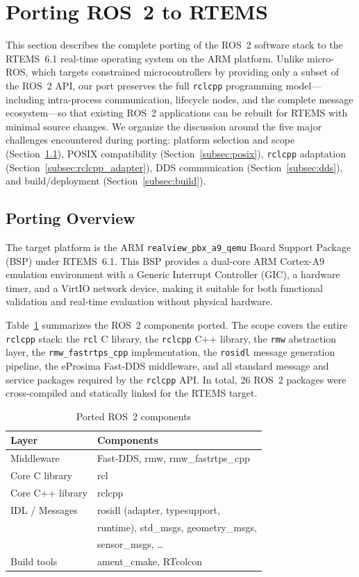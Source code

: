 \section{Porting ROS~2 to RTEMS}
\label{sec:porting}

This section describes the complete porting of the ROS~2 software stack to the RTEMS~6.1 real-time operating system on the ARM platform.
Unlike micro-ROS, which targets constrained microcontrollers by providing only a subset of the ROS~2 API, our port preserves the full \texttt{rclcpp} programming model---including intra-process communication, lifecycle nodes, and the complete message ecosystem---so that existing ROS~2 applications can be rebuilt for RTEMS with minimal source changes.
We organize the discussion around the five major challenges encountered during porting: platform selection and scope (Section~\ref{subsec:overview}), POSIX compatibility (Section~\ref{subsec:posix}), \texttt{rclcpp} adaptation (Section~\ref{subsec:rclcpp_adapter}), DDS communication (Section~\ref{subsec:dds}), and build/deployment (Section~\ref{subsec:build}).

\subsection{Porting Overview}
\label{subsec:overview}

The target platform is the ARM \texttt{realview\_pbx\_a9\_qemu} Board Support Package (BSP) under RTEMS~6.1.
This BSP provides a dual-core ARM Cortex-A9 emulation environment with a Generic Interrupt Controller (GIC), a hardware timer, and a VirtIO network device, making it suitable for both functional validation and real-time evaluation without physical hardware.

Table~\ref{tab:ported_components} summarizes the ROS~2 components ported.
The scope covers the entire \texttt{rclcpp} stack: the \texttt{rcl} C library, the \texttt{rclcpp} C++ library, the \texttt{rmw} abstraction layer, the \texttt{rmw\_fastrtps\_cpp} implementation, the \texttt{rosidl} message generation pipeline, the eProsima Fast-DDS middleware, and all standard message and service packages required by the \texttt{rclcpp} API.
In total, 26 ROS~2 packages were cross-compiled and statically linked for the RTEMS target.

\begin{table}[t]
\centering
\caption{Ported ROS~2 components}
\label{tab:ported_components}
\begin{tabular}{ll}
\hline
\textbf{Layer} & \textbf{Components} \\
\hline
Middleware    & Fast-DDS, rmw, rmw\_fastrtps\_cpp \\
Core C library & rcl \\
Core C++ library & rclcpp \\
IDL / Messages & rosidl (adapter, typesupport, \\
               & runtime), std\_msgs, geometry\_msgs, \\
               & sensor\_msgs, \ldots \\
Build tools   & ament\_cmake, RTcolcon \\
\hline
\end{tabular}
\end{table}

